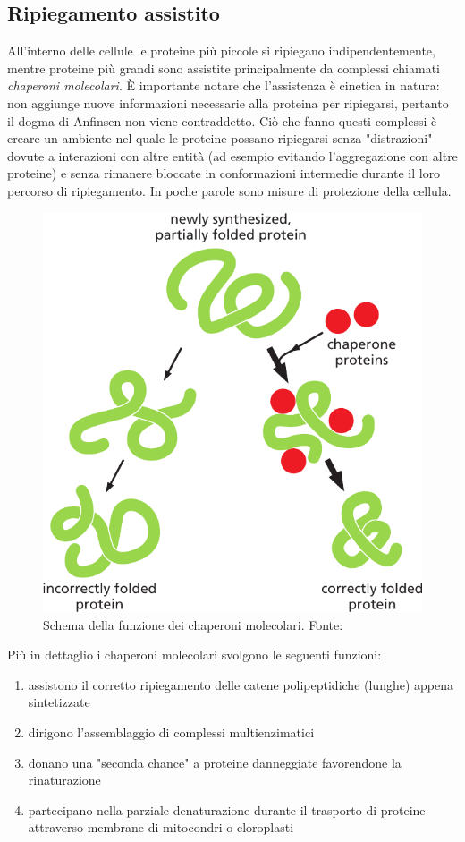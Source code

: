 {\subsection{Ripiegamento assistito}
All'interno delle cellule le proteine più piccole si ripiegano indipendentemente, mentre proteine più grandi sono assistite principalmente da complessi chiamati \textit{chaperoni molecolari}. È  importante notare che l'assistenza è cinetica in natura: non aggiunge nuove informazioni necessarie alla proteina per ripiegarsi, pertanto il dogma di Anfinsen non viene contraddetto. Ciò che fanno questi complessi è creare un ambiente nel quale le proteine possano ripiegarsi senza "distrazioni" dovute a interazioni con altre entità (ad esempio evitando l'aggregazione con altre proteine) e senza rimanere bloccate in conformazioni intermedie durante il loro percorso di ripiegamento. In poche parole sono misure di protezione della cellula. 

\begin{figure}[h]
	\centering
	\includegraphics[scale=0.4]{images/chaperone-alberts.png}
	\caption{Schema della funzione dei chaperoni molecolari. Fonte: \cite{alberts2018essential}}
	\label{fig:chaperoni}
\end{figure}

Più in dettaglio i chaperoni molecolari svolgono le seguenti funzioni:
\begin{enumerate}
	\item assistono il corretto ripiegamento delle catene polipeptidiche (lunghe) appena sintetizzate
	\item dirigono l'assemblaggio di complessi multienzimatici
	\item donano una "seconda chance" a proteine danneggiate favorendone la rinaturazione
	\item partecipano nella parziale denaturazione durante il trasporto di proteine attraverso membrane di mitocondri o cloroplasti
\end{enumerate}

}
